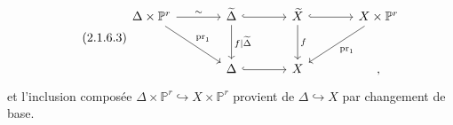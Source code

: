 \begin{equation}\tag{2.1.6.3}
\begin{tikzcd}[column sep=large, row sep=large]
\Delta \times \mathbb{P}^r \arrow[r, "\sim"] \arrow[dr, "\mathrm{pr}_1"] & \widetilde{\Delta} \arrow[r, hook] \arrow[d, "f|\widetilde{\Delta}"] & \widetilde{X} \arrow[r, hook] \arrow[d, "f"] & X \times \mathbb{P}^r \arrow[dl, "\mathrm{pr}_1"] \\
{} & \Delta \arrow[r, hook] & X & ,
\end{tikzcd}
\end{equation}
et l'inclusion composée $\Delta \times \mathbb{P}^r \hookrightarrow X \times \mathbb{P}^r$ provient de $\Delta \hookrightarrow X$ par changement de base.

